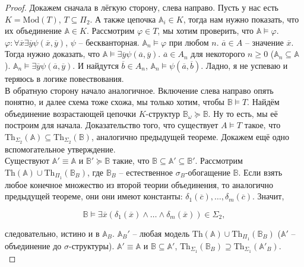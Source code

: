 \begin{proof}
    Докажем сначала в лёгкую сторону, слева направо. Пусть у нас есть $K = \text{Mod}(T)$, $T \subseteq \Pi_2$. А также цепочка $\mathbb{A}_i \in K$, тогда нам нужно показать, что их объединение $\mathbb{A} \in K$. Рассмотрим $\varphi \in T$, мы хотим проверить, что $\mathbb{A} \models \varphi$. $\varphi: \forall \overline{x} \exists \overline{y} \psi (\overline{x}, \overline{y})$, $\psi$ -- бескванторная. $\mathbb{A}_n \models \varphi$ при любом $n$. $\overline{a} \in A$ -- значение $\overline{x}$. Тогда нужно доказать, что $\mathbb{A} \models \exists \overline{y} \psi(\overline{a}, \overline{y})$. $\overline{a} \in A_n$ для некоторого $n \geq 0$ ($\mathbb{A}_n \subseteq \mathbb{A}$). $\mathbb{A}_n \models \exists \overline{y} \psi (\overline{a}, \overline{y})$. И найдутся $\overline{b} \in A_n$, $\mathbb{A}_n \models \psi(\overline{a}, \overline{b})$. Ладно, я не успеваю и теряюсь в логике повествования. \\ 

    В обратную сторону начало аналогичное. Включение слева направо опять понятно, и далее схема тоже схожа, мы только хотим, чтобы $\mathbb{B} \models T$. Найдём объединение возрастающей цепочки $K$-структур $\mathbb{B}_\omega \succeq \mathbb{B}$. Ну то есть, мы её построим для начала. Доказательство того, что существует $A \models T$ такое, что $\text{Th}_{\Sigma_2}(\mathbb{A}) \subseteq \text{Th}_{\Sigma_2}(\mathbb{B})$, аналогично предыдущей теореме. Докажем ещё одно вспомогательное утверждение. \\ 

    Существуют $\mathbb{A}' \equiv \mathbb{A}$ и $\mathbb{B}' \succeq \mathbb{B}$ такие, что $\mathbb{B} \subseteq \mathbb{A}' \subseteq \mathbb{B}'$. Рассмотрим $\text{Th}(\mathbb{A}) \cup \text{Th}_{\Pi_1}(\mathbb{B}_B)$, где $\mathbb{B}_B$ -- естественное $\sigma_B$-обогащение $\mathbb{B}$. Если взять любое конечное множество из второй теории объединения, то аналогично предыдущей теореме, они они имеют константы: $\delta_1(\overline{c}), \ldots, \delta_m(\overline{c})$. Значит, 

    \[ 
        \mathbb{B} \models \exists \overline{x} (\delta_1(\overline{x}) \wedge \ldots \wedge \delta_m(\overline{x})) \in \Sigma_2,
    \]

    следовательно, истино и в $\mathbb{A}_B$. $\mathbb{A}_B'$ -- любая модель $\text{Th}(\mathbb{A}) \cup \text{Th}_{\Pi_1}(\mathbb{B}_B)$ ($\mathbb{A}'$ -- объединение до $\sigma$-структуры). $\mathbb{A}' \equiv \mathbb{A}$ и $\mathbb{B} \subseteq \mathbb{A}'$, $\text{Th}_{\Sigma_1}(\mathbb{B}_B) \supseteq \text{Th}_{\Sigma_1}(\mathbb{A}'_B)$. \\ 


\end{proof}
